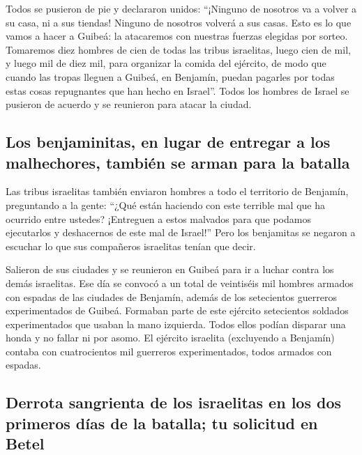  Todos se pusieron de pie y declararon unidos: ``¡Ninguno
de nosotros va a volver a su casa, ni a sus tiendas! Ninguno de nosotros
volverá a sus casas.  Esto es lo que vamos a hacer a
Guibeá: la atacaremos con nuestras fuerzas elegidas por sorteo.
 Tomaremos diez hombres de cien de todas las tribus
israelitas, luego cien de mil, y luego mil de diez mil, para organizar
la comida del ejército, de modo que cuando las tropas lleguen a Guibeá,
en Benjamín, puedan pagarles por todas estas cosas repugnantes que han
hecho en Israel''.  Todos los hombres de Israel se
pusieron de acuerdo y se reunieron para atacar la ciudad.

\hypertarget{los-benjaminitas-en-lugar-de-entregar-a-los-malhechores-tambiuxe9n-se-arman-para-la-batalla}{%
\subsection{Los benjaminitas, en lugar de entregar a los malhechores,
también se arman para la
batalla}\label{los-benjaminitas-en-lugar-de-entregar-a-los-malhechores-tambiuxe9n-se-arman-para-la-batalla}}

 Las tribus israelitas también enviaron hombres a todo el
territorio de Benjamín, preguntando a la gente: ``¿Qué están haciendo
con este terrible mal que ha ocurrido entre ustedes? 
¡Entreguen a estos malvados para que podamos ejecutarlos y deshacernos
de este mal de Israel!'' Pero los benjamitas se negaron a escuchar lo
que sus compañeros israelitas tenían que decir.

 Salieron de sus ciudades y se reunieron en Guibeá para
ir a luchar contra los demás israelitas.  Ese día se
convocó a un total de veintiséis mil hombres armados con espadas de las
ciudades de Benjamín, además de los setecientos guerreros experimentados
de Guibeá.  Formaban parte de este ejército setecientos
soldados experimentados que usaban la mano izquierda. Todos ellos podían
disparar una honda y no fallar ni por asomo.  El ejército
israelita (excluyendo a Benjamín) contaba con cuatrocientos mil
guerreros experimentados, todos armados con espadas.

\hypertarget{derrota-sangrienta-de-los-israelitas-en-los-dos-primeros-duxedas-de-la-batalla-tu-solicitud-en-betel}{%
\subsection{Derrota sangrienta de los israelitas en los dos primeros
días de la batalla; tu solicitud en
Betel}\label{derrota-sangrienta-de-los-israelitas-en-los-dos-primeros-duxedas-de-la-batalla-tu-solicitud-en-betel}}

